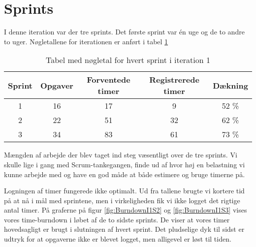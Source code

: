 \section{Sprints}

I denne iteration var der tre sprints. Det første sprint var én uge og de to andre to uger.
Nøgletallene for iterationen er anført i tabel \ref{table:iteration1sprints}

\begin{table}
\centering
\begin{tabular}{|c|c|c|c|c|}
\hline 
\textbf{Sprint} 	& \textbf{Opgaver} 	& \textbf{Forventede timer} 	& \textbf{Registrerede timer} 	& \textbf{Dækning} \\ 
\hline
1 		& 16 		& 17 				& 9 						& 52 \% \\ 
\hline 
2 		& 22 		& 51 				& 32						& 62 \% \\ 
\hline 
3 		& 34 		& 83 				& 61						& 73 \% \\ 
\hline 
\end{tabular}
\caption{Tabel med nøgletal for hvert sprint i iteration 1}
\label{table:iteration1sprints}
\end{table}

Mængden af arbejde der blev taget ind steg væsentligt over de tre sprints. Vi skulle lige i gang med Scrum-tankegangen, finde ud af hvor høj en belastning vi kunne arbejde med og have en god måde at både estimere og bruge timerne på.

Logningen af timer fungerede ikke optimalt. Ud fra tallene brugte vi kortere tid på at nå i mål med sprintene, men i virkeligheden fik vi ikke logget det rigtige antal timer. På graferne på figur \ref{fig:BurndownI1S2} og \ref{fig:BurndownI1S3} vises vores time-burndown i løbet af de to sidste sprints. De viser at vores timer hovedsagligt er brugt i slutningen af hvert sprint. Det pludselige dyk til sidst er udtryk for at opgaverne ikke er blevet logget, men alligevel er løst til tiden.

\begin{minipage}{0.5\textwidth}
\end{minipage}
\begin{minipage}{0.5\textwidth}
\end{minipage}